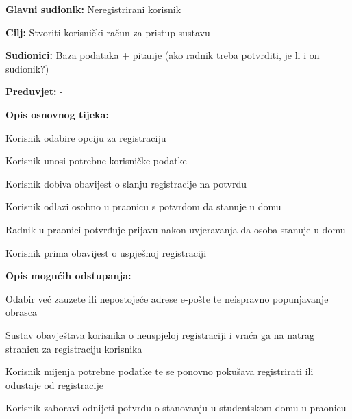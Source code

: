 \noindent {}
\begin{packed_item}
	
	\item \textbf{Glavni sudionik: } Neregistrirani korisnik
	\item  \textbf{Cilj:} Stvoriti korisnički račun za pristup sustavu
	\item  \textbf{Sudionici:}  Baza podataka + pitanje (ako radnik treba potvrditi, je li i on sudionik?)
	\item  \textbf{Preduvjet:} -
	\item  \textbf{Opis osnovnog tijeka:}
	
	\item[] \begin{packed_enum}
		
		\item Korisnik odabire opciju za registraciju
		\item Korisnik unosi potrebne korisničke podatke
		\item Korisnik dobiva obavijest o slanju registracije na potvrdu
		\item Korisnik odlazi osobno u praonicu s potvrdom da stanuje u domu 
		\item Radnik u praonici potvrđuje prijavu nakon uvjeravanja da osoba stanuje u domu
		\item Korisnik prima obavijest o uspješnoj registraciji
	\end{packed_enum}
	
	\item  \textbf{Opis mogućih odstupanja:}
	
	\item[] \begin{packed_item}
		
		\item[2.a] Odabir već zauzete ili nepostojeće adrese e-pošte te neispravno popunjavanje obrasca
		\item[] \begin{packed_enum}
			
			\item Sustav obavještava korisnika o neuspjeloj registraciji i vraća ga na natrag stranicu za registraciju korisnika
			\item Korisnik mijenja potrebne podatke te se ponovno pokušava registrirati ili odustaje od registracije
			
		\end{packed_enum}
		
		\item[4.a] Korisnik zaboravi odnijeti potvrdu o stanovanju u studentskom domu u praonicu
		\item[] \begin{packed_enum}
			

\end{packed_enum}
\end{packed_item}
\end{packed_item}
